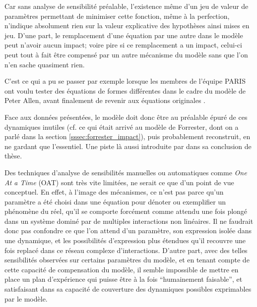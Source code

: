 Car sans analyse de sensibilité préalable, l'existence même d'un jeu de valeur de paramètres permettant de minimiser cette fonction, même à la perfection, n'indique absolument rien sur la valeur explicative des hypothèses ainsi mises en jeu. D'une part, le remplacement d'une équation par une autre dans le modèle peut n'avoir aucun impact; voire pire si ce remplacement a un impact, celui-ci peut tout à fait être compensé par un autre mécanisme du modèle sans que l'on n'en sache quasiment rien.

C'est ce qui a pu se passer par exemple lorsque les membres de l'équipe PARIS ont voulu tester des équations de formes différentes dans le cadre du modèle de Peter Allen, avant finalement de revenir aux équations originales \autocites{Sanders1984}[147]{Pumain1989}.

Face aux données présentées, le modèle doit donc être au préalable épuré de ces dynamiques inutiles (cf. ce qui était arrivé au modèle de Forrester, dont on a parlé dans la section \ref{sssec:forrester_impact}), puis probablement reconstruit, en ne gardant que l'essentiel. Une piste là aussi introduite par \textcite{Sanders1984} dans sa conclusion de thèse.

Des techniques d'analyse de sensibilités manuelles ou automatiques comme \textit{One At a Time} (OAT) sont très vite limitées, ne serait ce que d'un point de vue conceptuel. En effet, à l'image des mécanismes, ce n'est pas parce qu'un paramètre a été choisi dans une équation pour dénoter ou exemplifier un phénomène du réel, qu'il se comporte forcément comme attendu une fois plongé dans un système dominé par de multiples interactions non linéaires. Il ne faudrait donc pas confondre ce que l'on attend d'un paramètre, son expression isolée dans une dynamique, et les possibilités d'expression plus étendues qu'il recouvre une fois replacé dans ce réseau complexe d'interactions. D'autre part, avec des telles sensibilités observées sur certains paramètres du modèle, et en tenant compte de cette capacité de compensation du modèle, il semble impossible de mettre en place un plan d'expérience qui puisse être à la fois \enquote{humainement faisable}, et satisfaisant dans sa capacité de couverture des dynamiques possibles exprimables par le modèle.

